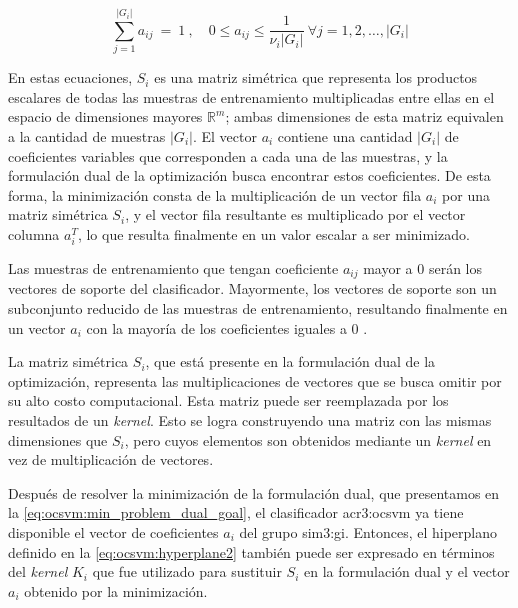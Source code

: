 \begin{equation}
    \label{eq:ocsvm:min_problem_dual_restr}
    \sum_{j=1}^{\lvert G_{i} \rvert} a_{ij} \ = \ 1
    \ , \quad
    0 \leqslant a_{ij} \leqslant \frac{1}{\nu_{i} \lvert G_{i} \rvert}
    \
    \forall j = 1,2, \dots, \lvert G_{i} \rvert
\end{equation}

En estas ecuaciones, $S_{i}$ es una matriz simétrica que representa los
productos escalares de todas las muestras de entrenamiento multiplicadas
entre ellas en el espacio de dimensiones mayores $\mathbb{R}^{m}$;
ambas dimensiones de esta matriz equivalen a la cantidad de muestras
$\lvert G_{i} \rvert$.
El vector $a_{i}$ contiene una cantidad $\lvert G_{i} \rvert$ de
coeficientes variables que corresponden a cada una de las muestras, y la
formulación dual de la optimización busca encontrar estos coeficientes.
De esta forma, la minimización consta de la multiplicación de un vector
fila $a_{i}$ por una matriz simétrica $S_{i}$, y el vector fila resultante
es multiplicado por el vector columna $a_{i}^{T}$, lo que resulta
finalmente en un valor escalar a ser minimizado.

Las muestras de entrenamiento que tengan coeficiente $a_{ij}$ mayor a
0 serán los vectores de soporte del clasificador. Mayormente, los vectores
de soporte son un subconjunto reducido de las muestras de entrenamiento,
resultando finalmente en un vector $a_{i}$ con la mayoría de los coeficientes
iguales a 0
\citep{perdisci2006using}. %

La matriz simétrica $S_{i}$, que está presente en la formulación dual
de la optimización, representa las multiplicaciones de vectores
que se busca omitir por su alto costo computacional. Esta matriz puede
ser reemplazada por los resultados de un \textit{kernel}. Esto se logra
construyendo una matriz con las mismas dimensiones que $S_{i}$, pero
cuyos elementos son obtenidos mediante un \textit{kernel} en vez de
multiplicación de vectores.

Después de resolver la minimización de la formulación dual, que
presentamos en la \autoref{eq:ocsvm:min_problem_dual_goal}, el clasificador
\gls{acr3:ocsvm} ya tiene disponible el vector de coeficientes $a_{i}$
del grupo \gls{sim3:gi}.
Entonces, el hiperplano definido en la \autoref{eq:ocsvm:hyperplane2}
también puede ser expresado en términos del \textit{kernel} $K_{i}$ que
fue utilizado para sustituir $S_{i}$ en la formulación dual y el vector
$a_{i}$ obtenido por la minimización.

